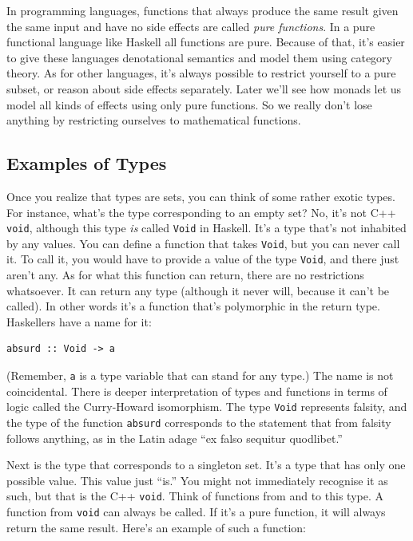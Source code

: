 In programming languages, functions that always produce the same result
given the same input and have no side effects are called \emph{pure
functions}. In a pure functional language like Haskell all functions are
pure. Because of that, it's easier to give these languages denotational
semantics and model them using category theory. As for other languages,
it's always possible to restrict yourself to a pure subset, or reason
about side effects separately. Later we'll see how monads let us model
all kinds of effects using only pure functions. So we really don't lose
anything by restricting ourselves to mathematical functions.

\subsection{Examples of Types}\label{examples-of-types}

Once you realize that types are sets, you can think of some rather
exotic types. For instance, what's the type corresponding to an empty
set? No, it's not C++ \texttt{void}, although this type \emph{is} called
\texttt{Void} in Haskell. It's a type that's not inhabited by any
values. You can define a function that takes \texttt{Void}, but you can
never call it. To call it, you would have to provide a value of the type
\texttt{Void}, and there just aren't any. As for what this function can
return, there are no restrictions whatsoever. It can return any type
(although it never will, because it can't be called). In other words
it's a function that's polymorphic in the return type. Haskellers have a
name for it:

\begin{verbatim}
absurd :: Void -> a
\end{verbatim}

(Remember, \texttt{a} is a type variable that can stand for any type.)
The name is not coincidental. There is deeper interpretation of types
and functions in terms of logic called the Curry-Howard isomorphism. The
type \texttt{Void} represents falsity, and the type of the function
\texttt{absurd} corresponds to the statement that from falsity follows
anything, as in the Latin adage ``ex falso sequitur quodlibet.''

Next is the type that corresponds to a singleton set. It's a type that
has only one possible value. This value just ``is.'' You might not
immediately recognise it as such, but that is the C++ \texttt{void}.
Think of functions from and to this type. A function from \texttt{void}
can always be called. If it's a pure function, it will always return the
same result. Here's an example of such a function:

